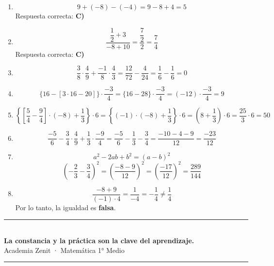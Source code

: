 \documentclass[11pt, letterpaper]{article}
\begin{document}
\begin{tcolorbox}[answerbox, title={Respuestas de algunos ejercicios finales}]
\begin{enumerate}[leftmargin=*, itemsep=5pt]
  \item[\textbf{1.}]
  \[
  9+(-8)-(-4)=9-8+4=5
  \]
  Respuesta correcta: \textbf{C)}

  \item[\textbf{2.}]
  \[
  \dfrac{\dfrac{1}{2}+3}{-8+10}
  =
  \dfrac{\dfrac{7}{2}}{2}
  =
  \dfrac{7}{4}
  \]
  Respuesta correcta: \textbf{C)}

  \item[\textbf{4.}]
  \[
  \dfrac{3}{8}\cdot\dfrac{4}{9}+\dfrac{-1}{8}\cdot\dfrac{4}{3}
  =
  \dfrac{12}{72}-\dfrac{4}{24}
  =
  \dfrac{1}{6}-\dfrac{1}{6}
  =
  0
  \]

  \item[\textbf{5.}]
  \[
  \{16-[3\cdot16-20]\}\cdot\dfrac{-3}{4}
  =
  \{16-28\}\cdot\dfrac{-3}{4}
  =
  (-12)\cdot\dfrac{-3}{4}
  =
  9
  \]

  \item[\textbf{6.}]
  \[
  \left\{\left[\dfrac{5}{4}-\dfrac{9}{4}\right]\cdot(-8)+\dfrac{1}{3}\right\}\cdot6
  =
  \left\{(-1)\cdot(-8)+\dfrac{1}{3}\right\}\cdot6
  =
  \left(8+\dfrac{1}{3}\right)\cdot6
  =
  \dfrac{25}{3}\cdot6
  =
  50
  \]

  \item[\textbf{7.}]
  \[
  \dfrac{-5}{6}-\dfrac{3}{4}\cdot\dfrac{4}{9}+\dfrac{1}{3}\cdot\dfrac{-9}{4}
  =
  \dfrac{-5}{6}-\dfrac{1}{3}-\dfrac{3}{4}
  =
  \dfrac{-10-4-9}{12}
  =
  \dfrac{-23}{12}
  \]

  \item[\textbf{9.}]
  \[
  a^2-2ab+b^2=(a-b)^2
  \]
  \[
  \left(-\dfrac{2}{3}-\dfrac{3}{4}\right)^2
  =
  \left(\dfrac{-8-9}{12}\right)^2
  =
  \left(\dfrac{-17}{12}\right)^2
  =
  \dfrac{289}{144}
  \]

  \item[\textbf{10.}]
  \[
  \dfrac{-8+9}{(-1)\cdot4}
  =
  \dfrac{1}{-4}
  =
  -\dfrac{1}{4}
  \neq
  \dfrac{1}{4}
  \]
  Por lo tanto, la igualdad es \textbf{falsa}.
\end{enumerate}
\end{tcolorbox}

\vspace{8pt}
\begin{center}
  \rule{\linewidth}{1.5pt}\\[4pt]
  {\large\bfseries\color{zenitnavy} La constancia y la práctica son la clave del aprendizaje.}\\[2pt]
  {\color{zenitgold}\small Academia Zenit · Matemática 1° Medio}
  \rule{\linewidth}{1.5pt}
\end{center}
\end{document}
